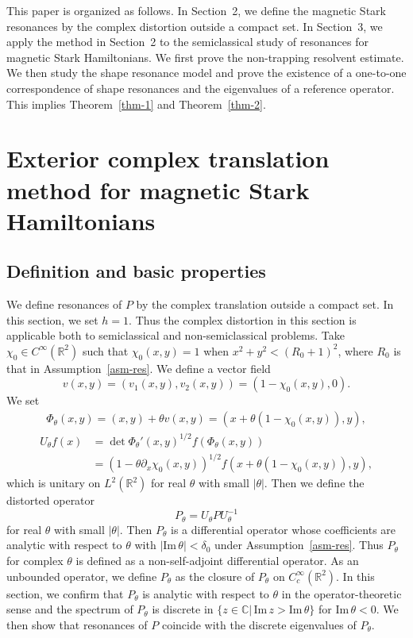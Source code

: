 \documentclass{article}
\theoremstyle{plain}
\theoremstyle{definition}
\theoremstyle{remark}
\newcommand{\RR}{\mathbb{R}}
\newcommand{\CC}{\mathbb{C}}
\newcommand{\Cinf}{C^{\infty}}
\newcommand{\IM}{\mathrm{Im}\,}
\begin{document}
This paper is organized as follows.
In Section~2, we define the magnetic Stark resonances by the complex distortion outside a compact set. 
In Section~3, we apply the method in Section~2 to the semiclassical study of resonances for magnetic Stark Hamiltonians. 
We first prove the non-trapping resolvent estimate. 
We then study the shape resonance model and prove the existence of a one-to-one correspondence of 
shape resonances and the eigenvalues of a reference operator. This implies Theorem~\ref{thm-1} and Theorem~\ref{thm-2}.  


\section{Exterior complex translation method for magnetic Stark Hamiltonians}\label{sec-2}
\subsection{Definition and basic properties} 
We define resonances of $P$ by the complex translation outside a compact set. 
In this section, we set $h=1$.  
Thus the complex distortion in this section is applicable both to semiclassical and non-semiclassical problems. 
Take $\chi_0\in \Cinf(\RR^2)$ such that $\chi_0(x, y)=1$ when $x^2+y^2<(R_0+1)^2$, where $R_0$ is that in Assumption~\ref{asm-res}. 
We define a vector field 
\[
v(x, y)=(v_1(x,y),v_2(x,y))=(1-\chi_0(x, y), 0). 
\]
We set 
\begin{align*}
\Phi_{\theta}(x, y)=(x, y)+\theta v(x, y)=(x+\theta (1-\chi_0(x, y)), y),
\end{align*}
\begin{align*}
U_{\theta}f(x)&=\det \Phi_{\theta}'(x, y)^{1/2}f(\Phi_{\theta}(x, y))\\
              &=(1-\theta\partial_x \chi_0(x, y))^{1/2}f(x+\theta (1-\chi_0(x, y)), y), 
\end{align*}
which is unitary on $L^2(\RR^2)$ for real $\theta$ with small $|\theta|$. 
Then we define the distorted operator 
\[
P_{\theta}=U_{\theta}P U_{\theta}^{-1}
\]
for real $\theta$ with small $|\theta|$. 
Then $P_{\theta}$ is a differential operator whose coefficients are analytic with respect to $\theta$ 
with $|\IM \theta|<\delta_0$ under Assumption~\ref{asm-res}. 
Thus $P_{\theta}$ for complex $\theta$ is defined as a non-self-adjoint differential operator. 
As an unbounded operator, we define $P_{\theta}$ as the closure of $P_{\theta}$ on $\Cinf_c(\RR^2)$. 
In this section, we confirm that $P_{\theta}$ is analytic with respect to $\theta$ in the operator-theoretic sense 
and the spectrum of $P_{\theta}$ is discrete in $\{z\in \CC|\, \IM z>\IM \theta\}$ 
for $\IM \theta<0$. 
We then show that resonances of $P$ coincide with the discrete eigenvalues of $P_{\theta}$. 
\end{document}
